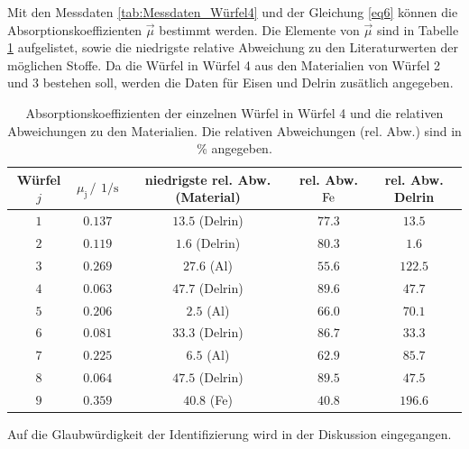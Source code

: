 Mit den Messdaten \ref{tab:Messdaten_Würfel4} und der Gleichung \ref{eq6} können die 
Absorptionskoeffizienten $\vec{\mu}$ bestimmt werden. Die Elemente von $\vec{\mu}$ sind in Tabelle \ref{tab:Würfel4_mu} 
aufgelistet, sowie die niedrigste relative Abweichung zu den Literaturwerten der möglichen Stoffe. Da die 
Würfel in Würfel 4 aus den Materialien von Würfel 2 und 3 bestehen soll, werden die Daten für Eisen und Delrin zusätlich angegeben.

\FloatBarrier
\begin{table}
    \centering
    \caption{Absorptionskoeffizienten der einzelnen Würfel in Würfel 4 und die relativen Abweichungen zu den Materialien. Die relativen Abweichungen (rel. Abw.) sind in \% angegeben.}
    \label{tab:Würfel4_mu}
    \begin{tabular}{c c c c c}
        \toprule
        Würfel $j$&$\mu_{\text{j}} \,/\,\SI{}{1\per\second}$&niedrigste rel. Abw. (Material)& rel. Abw. $\ce{Fe}$&rel. Abw. Delrin\\
        \midrule
        $\num{1}$ &$\num{0.137}$&$\num{13.5}$ (Delrin)&$\num{77.3}$&$\num{13.5}$\\
        $\num{2}$ &$\num{0.119}$&$\num{1.6}$ (Delrin)&$\num{80.3}$&$\num{1.6}$\\
        $\num{3}$ &$\num{0.269}$&$\num{27.6}$ (Al)&$\num{55.6}$&$\num{122.5}$\\
        $\num{4}$ &$\num{0.063}$&$\num{47.7}$ (Delrin)&$\num{89.6}$&$\num{47.7}$\\
        $\num{5}$ &$\num{0.206}$&$\num{2.5}$ (Al)&$\num{66.0}$&$\num{70.1}$\\
        $\num{6}$ &$\num{0.081}$&$\num{33.3}$ (Delrin)&$\num{86.7}$&$\num{33.3}$\\
        $\num{7}$ &$\num{0.225}$&$\num{6.5}$ (Al)&$\num{62.9}$&$\num{85.7}$\\
        $\num{8}$ &$\num{0.064}$&$\num{47.5}$ (Delrin)&$\num{89.5}$&$\num{47.5}$\\
        $\num{9}$ &$\num{0.359}$&$\num{40.8}$ (Fe)&$\num{40.8}$&$\num{196.6}$\\
        \bottomrule
    \end{tabular}
\end{table}
\FloatBarrier

Auf die Glaubwürdigkeit der Identifizierung wird in der Diskussion eingegangen.
\newpage